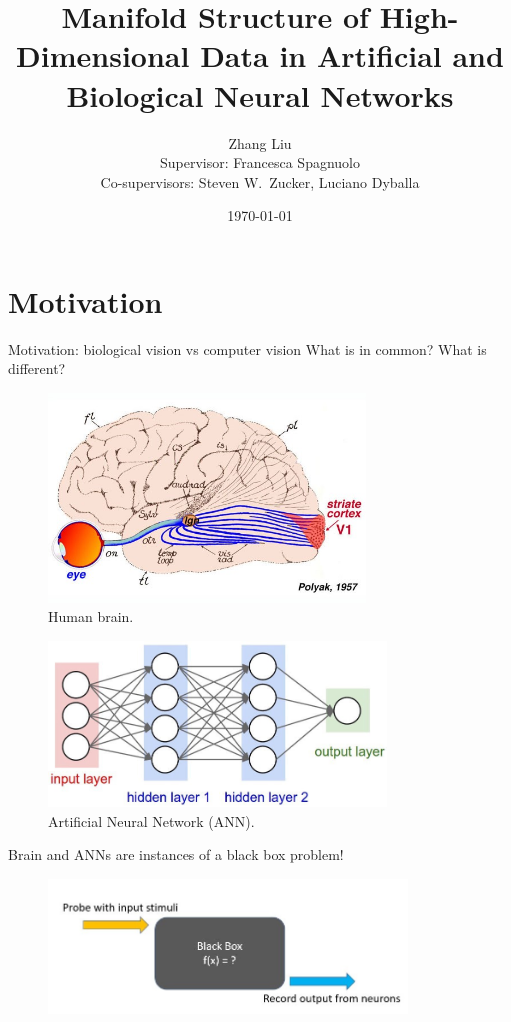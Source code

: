 \documentclass[xcolor={dvipsnames,svgnames}]{beamer}
\title{Manifold Structure of High-Dimensional Data in Artificial and Biological Neural Networks}
\author{Zhang Liu\\ Supervisor: Francesca Spagnuolo \\ Co-supervisors: Steven W.~Zucker, Luciano Dyballa}
\date{\today}
\begin{document}
\begin{frame}
\titlepage
\end{frame}

\section{Motivation}
\begin{frame}{Motivation: biological vision vs computer vision}
What is in common? What is different?

 \begin{minipage}[t]{.42\linewidth}  
    \begin{figure}
            \includegraphics[width=0.75\textwidth]{presentation/figures-models/v1.jpg}
            \caption{Human brain.}
        \end{figure} 
    \end{minipage}
      \begin{minipage}[t]{.55\linewidth}   
      \begin{figure}         \includegraphics[width=0.8\textwidth]{presentation/figures-models/simple-ann.jpeg}
            \caption{Artificial Neural Network (ANN).}
            \end{figure} 
    \end{minipage}
    Brain and ANNs are instances of a black box problem! 
        \begin{figure}
            \includegraphics[width=0.85\textwidth]{presentation/figures-models/black-box.jpg}
        \end{figure} 
\end{frame}
\end{document}
